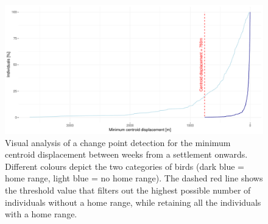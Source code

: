 \begin{figure}[H]
\centering
\includegraphics[width=1\textwidth]{figures/methods/03_centroid_displacement.pdf}
\caption[Change point detection for the minimum centroid displacement between weeks from a settlement onwards]{Visual analysis of a change point detection for the minimum centroid displacement between weeks from a settlement onwards. Different colours depict the two categories of birds (dark blue = home range, light blue = no home range). The dashed red line shows the threshold value that filters out the highest possible number of individuals without a home range, while retaining all the individuals with a home range.}
\label{figure:centroid_displacement}
\end{figure}



\newpage
